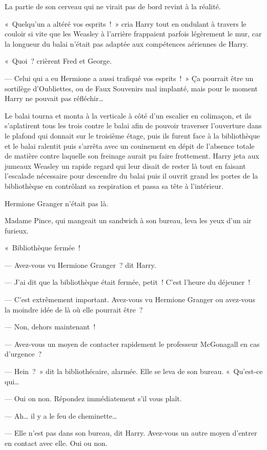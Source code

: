 La partie de son cerveau qui ne virait pas de bord revint à la réalité.

«~Quelqu'un a altéré vos esprits~!~»
cria Harry tout en ondulant à travers le couloir si vite que les Weasley à l'arrière frappaient parfois légèrement le mur, car la longueur du balai n'était pas adaptée aux compétences aériennes de Harry.

«~Quoi~? crièrent Fred et George.

--- Celui qui a eu Hermione a aussi trafiqué vos esprits~!~»
Ça pourrait être un sortilège d'Oubliettes, ou de Faux Souvenirs mal implanté, mais pour le moment Harry ne pouvait pas réfléchir…

Le balai tourna et monta à la verticale à côté d'un escalier en colimaçon, et ils s'aplatirent tous les trois contre le balai afin de pouvoir traverser l'ouverture dans le plafond qui donnait sur le troisième étage, puis ils furent face à la bibliothèque et le balai ralentit puis s'arrêta avec un couinement en dépit de l'absence totale de matière contre laquelle son freinage aurait pu faire frottement.
Harry jeta aux jumeaux Weasley un rapide regard qui leur disait de rester là tout en faisant l'escalade nécessaire pour descendre du balai puis il ouvrit grand les portes de la bibliothèque en contrôlant sa respiration et passa sa tête à l'intérieur.

Hermione Granger n'était pas là.

Madame Pince, qui mangeait un sandwich à son bureau, leva les yeux d'un air furieux.

«~Bibliothèque fermée~!

--- Avez-vous vu Hermione Granger~? dit Harry.

--- J'ai dit que la bibliothèque était fermée, petit~!
C'est l'heure du déjeuner~!

--- C'est extrêmement important.
Avez-vous vu Hermione Granger ou avez-vous la moindre idée de là où elle pourrait être~?

--- Non, dehors maintenant~!

--- Avez-vous un moyen de contacter rapidement le professeur McGonagall en cas d'urgence~?

--- Hein~?~»
dit la bibliothécaire, alarmée.
Elle se leva de son bureau.
«~Qu'est-ce qui…

--- Oui on non.
Répondez immédiatement s'il vous plaît.

--- Ah… il y a le feu de cheminette…

--- Elle n'est pas dans son bureau, dit Harry.
Avez-vous un autre moyen d'entrer en contact avec elle.
Oui ou non.

